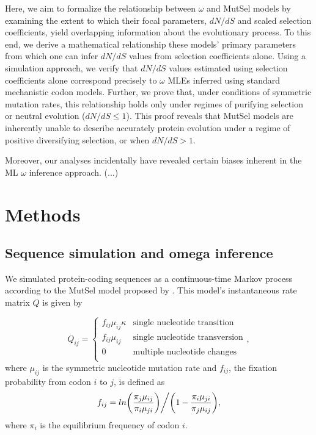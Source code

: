 \documentclass[11pt]{article}
\begin{document}
Here, we aim to formalize the relationship between $\omega$ and MutSel models by examining the extent to which their focal parameters, $dN/dS$ and scaled selection coefficients, yield overlapping information about the evolutionary process. To this end, we derive a mathematical relationship these models' primary parameters from which one can infer $dN/dS$ values from selection coefficients alone. Using a simulation approach, we verify that $dN/dS$ values estimated using selection coefficients alone correspond precisely to $\omega$ MLEs inferred using standard mechanistic codon models. Further, we prove that, under conditions of symmetric mutation rates, this relationship holds only under regimes of purifying selection or neutral evolution ($dN/dS \leq 1$). This proof reveals that MutSel models are inherently unable to describe accurately protein evolution under a regime of positive diversifying selection, or when $dN/dS > 1$.

Moreover, our analyses incidentally have revealed certain biases inherent in the ML $\omega$ inference approach. (...)
 


\section*{Methods}

\subsection*{Sequence simulation and omega inference}
We simulated protein-coding sequences as a continuous-time Markov
process \cite{Yang2006} according to the MutSel model proposed by \cite{HalpernBruno1998}. This model's instantaneous rate matrix $Q$ is given by 

\begin{equation}
Q_{ij} = \left\{ \begin{array}{rl}
              f_{ij}\mu_{ij}\kappa               &\mbox{single nucleotide transition} \\
              f_{ij}\mu_{ij}                          &\mbox{single nucleotide transversion} \\
              0                                           &\mbox{multiple nucleotide changes} \\             
         \end{array} \right.,
\end{equation} where $\mu_{ij}$ is the symmetric nucleotide mutation rate and $f_{ij}$, the fixation probability from codon $i$ to $j$, is defined as \begin{equation}f_{ij} = ln\bigg{(}\frac{\pi_j\mu_{ij}}{\pi_i\mu_{ji}}\bigg{)}\bigg{/}\bigg{(}1 - \frac{\pi_i\mu_{ji}}{\pi_j\mu_{ij}}\bigg{)},\end{equation} where $\pi_i$ is the equilibrium frequency of codon $i$.
\end{document}
